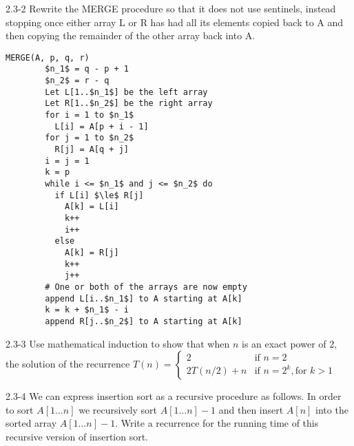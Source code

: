 \begin{problem}{2.3-2}
  Rewrite the MERGE procedure so that it does not use sentinels, instead stopping once either array L or R has had all its
  elements copied back to A and then copying the remainder of the other array back into A.

  \begin{solution}
    \begin{lstlisting}[mathescape]
      MERGE(A, p, q, r)
        $n_1$ = q - p + 1
        $n_2$ = r - q
        Let L[1..$n_1$] be the left array
        Let R[1..$n_2$] be the right array
        for i = 1 to $n_1$
          L[i] = A[p + i - 1]
        for j = 1 to $n_2$
          R[j] = A[q + j]
        i = j = 1
        k = p
        while i <= $n_1$ and j <= $n_2$ do
          if L[i] $\le$ R[j]
            A[k] = L[i]
            k++
            i++
          else
            A[k] = R[j]
            k++
            j++
        # One or both of the arrays are now empty
        append L[i..$n_1$] to A starting at A[k]
        k = k + $n_1$ - i
        append R[j..$n_2$] to A starting at A[k]
    \end{lstlisting}
  \end{solution}
\end{problem}

\begin{problem}{2.3-3}
Use mathematical induction to show that when $n$ is an exact power of 2, the solution of the recurrence
  $T(n) = \begin{cases}
    2 & \text{if } n = 2 \\
    2T(n/2) + n & \text{if } n = 2^k, \text{for } k >1
  \end{cases}
  $
\end{problem}

\begin{problem}{2.3-4}
  We can express insertion sort as a recursive procedure as follows. In order to sort $A[1\ldots n]$ we recursively sort
  $A[1\ldots n] - 1 $ and then insert $A[n]$ into the sorted array $A[1\ldots n] - 1 $.
  Write a recurrence for the running time of this recursive version of insertion sort.
\end{problem}


